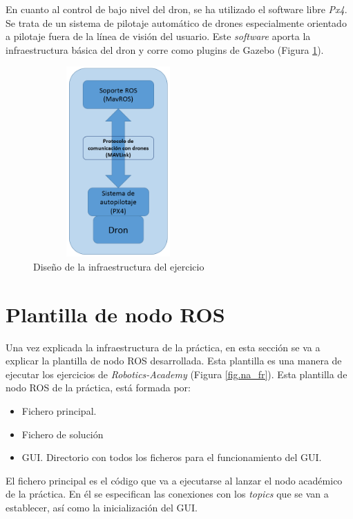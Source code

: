 En cuanto al control de bajo nivel del dron, se ha utilizado el software libre \textit{Px4}. Se trata de un sistema de pilotaje automático de drones especialmente orientado a pilotaje fuera de la línea de visión del usuario. Este \textit{software} aporta la infraestructura básica del dron y corre como plugins de Gazebo (Figura \ref{fig.diseno_fr}).

\begin{figure}[H]
  \begin{center}
    \includegraphics[width=6.5cm, height=7.3cm]{figures/diseno_fr.png}
		\caption{Diseño de la infraestructura del ejercicio}
		\label{fig.diseno_fr}
		\end{center}
\end{figure} 

\section{Plantilla de nodo ROS}
Una vez explicada la infraestructura de la práctica, en esta sección se va a explicar la plantilla de nodo ROS desarrollada. Esta plantilla es una manera de ejecutar los ejercicios de \textit{Robotics-Academy} (Figura \ref{fig.na_fr}). Esta plantilla de nodo ROS de la práctica, está formada por:

\begin{itemize}
    \item Fichero principal.
    \item Fichero de solución
    \item GUI. Directorio con todos los ficheros para el funcionamiento del GUI.
\end{itemize}

El fichero principal es el código que va a ejecutarse al lanzar el nodo académico de la práctica. En él se especifican las conexiones con los \textit{topics} que se van a establecer, así como la inicialización del GUI.

